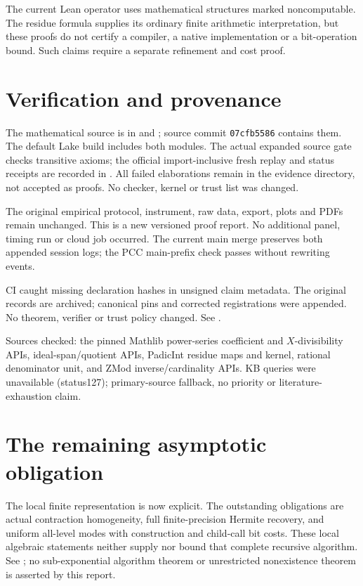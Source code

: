 \documentclass[10pt]{article}
\begin{document}
The current Lean operator uses mathematical structures marked noncomputable.
The residue formula supplies its ordinary finite arithmetic interpretation,
but these proofs do not certify a compiler, a native implementation or a
bit-operation bound. Such claims require a separate refinement and cost proof.

\section*{Verification and provenance}
The mathematical source is in  and
; source commit \texttt{07cfb5586} contains
them. The default Lake build includes both modules. The actual expanded
source gate checks transitive axioms; the official import-inclusive fresh
replay and status receipts are recorded in
. All failed elaborations remain
in the evidence directory, not accepted as proofs. No checker, kernel or
trust list was changed.

The original empirical protocol, instrument, raw data, export, plots and PDFs
remain unchanged. This is a new versioned proof report. No additional panel,
timing run or cloud job occurred. The current main merge preserves both
appended session logs; the PCC main-prefix check passes without rewriting
events.

CI caught missing declaration hashes in unsigned claim metadata. The original
records are archived; canonical pins and corrected registrations were appended.
No theorem, verifier or trust policy changed. See .

Sources checked: the pinned Mathlib power-series coefficient and
$X$-divisibility APIs, ideal-span/quotient APIs, PadicInt residue maps and
kernel, rational denominator unit, and ZMod inverse/cardinality APIs. KB
queries were unavailable (status127); primary-source fallback, no priority
or literature-exhaustion claim.

\section*{The remaining asymptotic obligation}
The local finite representation is now explicit. The outstanding obligations
are actual contraction homogeneity, full finite-precision Hermite recovery,
and uniform all-level modes with construction and child-call bit costs.
These local algebraic statements neither supply nor bound that complete
recursive algorithm. See ; no sub-exponential algorithm theorem
or unrestricted nonexistence theorem is asserted by this report.
\end{document}
